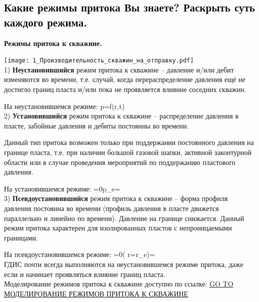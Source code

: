 

\subsection{Какие режимы притока Вы знаете? Раскрыть суть каждого режима.}

\textbf{Режимы притока к скважине.}

\texttt{[image: 1\_Производительность\_скважин\_на\_отправку.pdf]}
\ \\

1) \textbf{Неустановившийся} режим притока к скважине -- давление и/или дебит изменяются во времени, т.е. случай, когда перераспределение давления ещё не достигло границ пласта и/или пока не проявляется влияние соседних скважин.

На неустановившемся режиме:
\beq
p=f(r,t)
\eeq
\ \\

2) \textbf{Установившийся} режим притока к скважине -- распределение давления в пласте, забойные давления и дебиты постоянны во времени.

Данный тип притока возможен только при поддержании постоянного давления на границе пласта, т.е. при наличии большой газовой шапки, активной законтурной области или в случае проведения мероприятий по поддержанию пластового давления.

На установившемся режиме:
\beq
{}=0p_e=
\eeq
\ \\


3) \textbf{Псевдоустановившийся} режим притока к скважине -- форма профиля давления постоянна во времени (профиль давления в пласте движется параллельно и линейно по времени).
Давление на границе снижается.
Данный режим притока характерен для изолированных пластов с непроницаемыми границами.

На псевдоустановившемся режиме:
\beq
{}=0\left( r=r_e\right)=
\eeq
\ \\

ГДИС почти всегда выполняются на неустановившемся режиме притока, даже если и начинает проявляться влияние границ пласта.
\\

Моделирование режимов притока к скважине доступно по ссылке: \href{https://github.com/mualal/source/blob/main/well_productivity/productivity.ipynb}{GO TO МОДЕЛИРОВАНИЕ РЕЖИМОВ ПРИТОКА К СКВАЖИНЕ}

